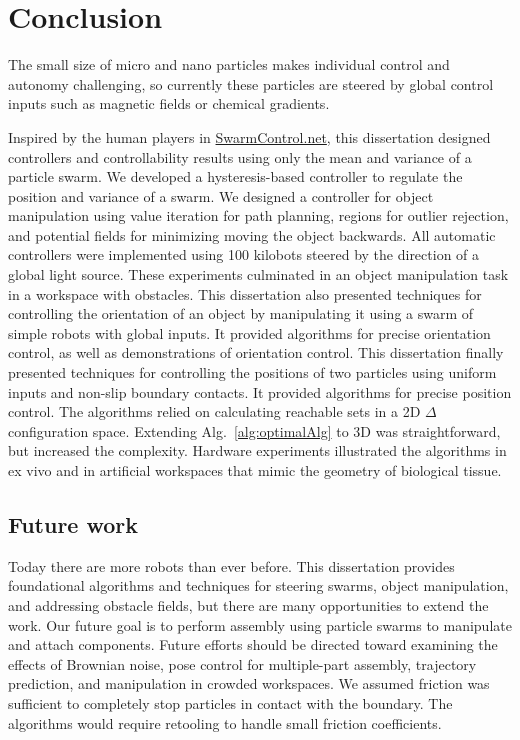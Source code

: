 
\chapter[Conclusion]{Conclusion}
\label{chap-conc}


  The small size of micro and nano particles makes individual control and autonomy challenging, so currently these particles are steered by global control inputs such as magnetic fields or chemical gradients.

Inspired by the human players in \href{www.swarmcontrol.net}{SwarmControl.net}, this dissertation designed controllers and controllability results using only the mean and variance of a particle swarm. 
We developed a hysteresis-based controller to regulate the position and variance of a swarm. We designed a controller for object manipulation using value iteration for path planning, regions for outlier rejection, and potential fields for minimizing moving the object backwards. 
All automatic controllers were implemented using 100 kilobots steered by the direction of a global light source.
These experiments culminated in an object manipulation task in a workspace with obstacles.
This dissertation also presented techniques for controlling the orientation of an object by manipulating it using a swarm of simple robots with global inputs.
It provided algorithms for precise orientation control, as well as demonstrations of orientation control. 
 This dissertation finally presented techniques for controlling the positions of two particles using uniform inputs and non-slip boundary contacts.  
 It provided algorithms for precise position control. The algorithms relied on calculating reachable sets in a 2D $\Delta$ configuration space.
 Extending Alg.~\ref{alg:optimalAlg}  to 3D was straightforward, but increased the complexity.
 Hardware experiments illustrated the algorithms in ex vivo and in artificial workspaces that mimic the geometry of biological tissue.
 
 \section{Future work}
 
 Today there are more robots than ever before.
 This dissertation provides foundational algorithms and techniques for steering swarms, object manipulation, and addressing obstacle fields, but there are many opportunities to extend the work.
 Our future goal is to perform assembly using particle swarms to manipulate and attach components. Future efforts should be directed toward examining the effects of Brownian noise, pose control for multiple-part assembly, trajectory prediction, and manipulation in crowded workspaces.
 We assumed friction was sufficient to completely stop particles in contact with the boundary. 
  The algorithms would require retooling to handle small friction coefficients.
 
